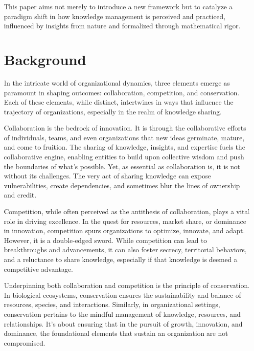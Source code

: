 \documentclass[sn-nature]{sn-jnl}%
\theoremstyle{thmstyleone}%
\theoremstyle{thmstyletwo}%
\theoremstyle{thmstylethree}%
\begin{document}
This paper aims not merely to introduce a new framework but to catalyze a paradigm shift in how knowledge management is perceived and practiced, influenced by insights from nature and formalized through mathematical rigor.



\section{Background}\label{sec2}

In the intricate world of organizational dynamics, three elements emerge as paramount in shaping outcomes: collaboration, competition, and conservation. Each of these elements, while distinct, intertwines in ways that influence the trajectory of organizations, especially in the realm of knowledge sharing.

Collaboration is the bedrock of innovation\cite{faems_interorganizational_2005}\cite{gonzalez_impact_2003}\cite{ndibu_muntu_keba_kebe_variables_2019}. It is through the collaborative efforts of individuals, teams, and even organizations that new ideas germinate, mature, and come to fruition. The sharing of knowledge, insights, and expertise fuels the collaborative engine, enabling entities to build upon collective wisdom and push the boundaries of what's possible. Yet, as essential as collaboration is, it is not without its challenges. The very act of sharing knowledge can expose vulnerabilities, create dependencies, and sometimes blur the lines of ownership and credit.

Competition, while often perceived as the antithesis of collaboration, plays a vital role in driving excellence. In the quest for resources, market share, or dominance in innovation, competition spurs organizations to optimize, innovate, and adapt. However, it is a double-edged sword. While competition can lead to breakthroughs and advancements, it can also foster secrecy, territorial behaviors, and a reluctance to share knowledge, especially if that knowledge is deemed a competitive advantage\cite{dimitriades_creating_2005}.

Underpinning both collaboration and competition is the principle of conservation. In biological ecosystems, conservation ensures the sustainability and balance of resources, species, and interactions. Similarly, in organizational settings, conservation pertains to the mindful management of knowledge, resources, and relationships. It's about ensuring that in the pursuit of growth, innovation, and dominance, the foundational elements that sustain an organization are not compromised.
\end{document}
